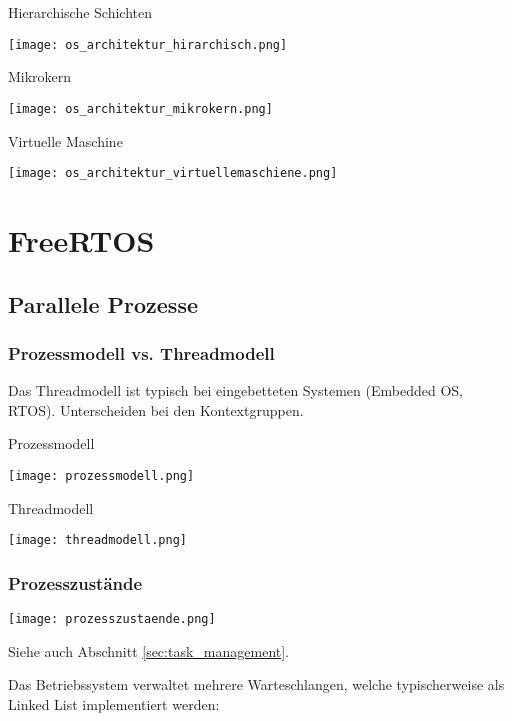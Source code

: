 \begin{minipage}[t]{.45\linewidth}
	\centering
	Hierarchische Schichten

	\texttt{[image: os\_architektur\_hirarchisch.png]}
\end{minipage}\hfill
\begin{minipage}[t]{.45\linewidth}
	\centering
	Mikrokern

	\texttt{[image: os\_architektur\_mikrokern.png]}
\end{minipage}

\begin{minipage}[t]{\linewidth}
	\centering
	Virtuelle Maschine

	\texttt{[image: os\_architektur\_virtuellemaschiene.png]}
\end{minipage}


\section{FreeRTOS}
\subsection{Parallele Prozesse}
\subsubsection{Prozessmodell vs. Threadmodell}
Das Threadmodell ist typisch bei eingebetteten Systemen (Embedded OS, RTOS). Unterscheiden bei den Kontextgruppen.

\begin{minipage}[t]{.49\linewidth}
	Prozessmodell

	\texttt{[image: prozessmodell.png]}
\end{minipage}\hfill
\begin{minipage}[t]{.49\linewidth}
	Threadmodell

	\texttt{[image: threadmodell.png]}
\end{minipage}

\subsubsection{Prozesszustände}

\texttt{[image: prozesszustaende.png]}

Siehe auch Abschnitt \ref{sec:task_management}.

Das Betriebssystem verwaltet mehrere Warteschlangen, welche typischerweise als Linked List implementiert werden:

